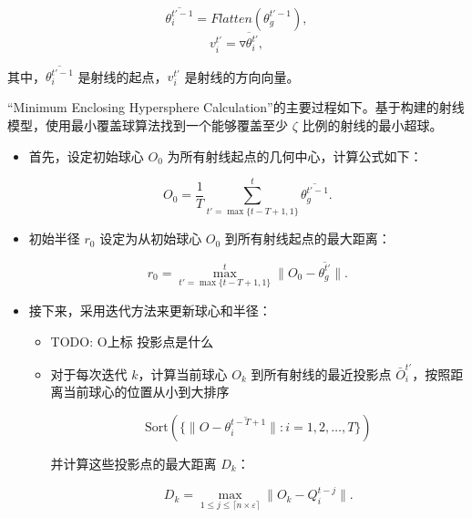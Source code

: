 \documentclass[lettersize,journal]{IEEEtran}
\begin{document}
\begin{enumerate}
\begin{itemize}
    \begin{equation}
    \overline{\theta_{i}^{t'-1}} = Flatten(\theta_g^{t'-1}),
    \end{equation}
    \begin{equation}
    {v}_{i}^{t'} = \overline{\triangledown\theta_{i}^{t'}},
    \end{equation}

    其中，\( \overline{\theta_{i}^{t'-1}} \) 是射线的起点，\( {v}_{i}^{t'} \) 是射线的方向向量。
\end{itemize}

“Minimum Enclosing Hypersphere Calculation”的主要过程如下。基于构建的射线模型，使用最小覆盖球算法找到一个能够覆盖至少 \( \zeta \) 比例的射线的最小超球。

\begin{itemize}
    \item 首先，设定初始球心 \( O_0 \) 为所有射线起点的几何中心，计算公式如下：

    \begin{equation}
    O_0 = \frac{1}{T} \sum_{t'=\max\{t-T+1, 1\}}^{t} \overline{\theta_g^{t'-1}}.
    \end{equation}

    \item 初始半径 \( r_0 \) 设定为从初始球心 \( O_0 \) 到所有射线起点的最大距离：

    \begin{equation}
    r_0 = \max_{t'=\max\{t-T+1, 1\}}^{t}  \|O_0 - \overline{\theta_{g}^{t'}}\|.
    \end{equation}

    \item 接下来，采用迭代方法来更新球心和半径：
    \begin{itemize}

        \item TODO: O上标  投影点是什么
    
       \item 对于每次迭代 \( k \)，计算当前球心 \( O_k \) 到所有射线的最近投影点 \( \bar{O}_{i}^{t'} \)，按照距离当前球心的位置从小到大排序

        \begin{equation}
        \text{Sort}(\{ \| O - \overline{\theta_{i}^{t-T+1}} \| : i = 1, 2, \ldots, T \})
        \end{equation}

        并计算这些投影点的最大距离 \( D_k \)：

        \begin{equation}
        D_k = \max_{1\leq j\leq \lceil n\times \varepsilon\rceil} \|O_k - Q_{i}^{t-j}\|.
        \end{equation}


\end{itemize}
\end{itemize}
\end{enumerate}
\end{document}
